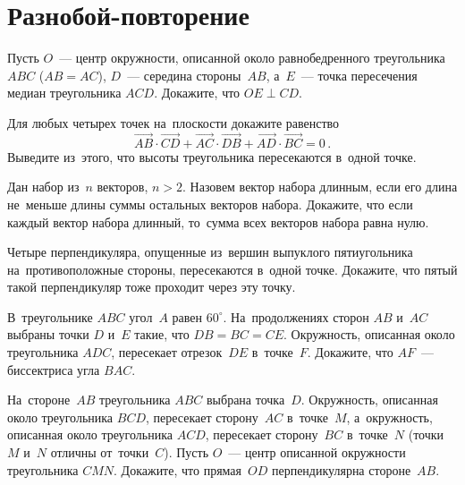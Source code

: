 

\section*{Разнобой-повторение}


\begin{problems}
\let\ov\overrightarrow

\item
Пусть $O$~--- центр окружности, описанной около равнобедренного треугольника
$ABC$ ($AB = AC$), $D$~--- середина стороны~$AB$, а~$E$~--- точка пересечения
медиан треугольника $ACD$.
Докажите, что $OE \perp CD$.

\item
\sp
Для любых четырех точек на~плоскости докажите равенство
\[
    \ov{AB} \cdot \ov{CD} +
    \ov{AC} \cdot \ov{DB} +
    \ov{AD} \cdot \ov{BC}
=
    0
\, . \]
\sp
Выведите из~этого, что высоты треугольника пересекаются в~одной точке.

\item
Дан набор из~$n$ векторов, $n > 2$.
Назовем вектор набора длинным, если его длина не~меньше длины суммы остальных
векторов набора.
Докажите, что если каждый вектор набора длинный, то~сумма всех векторов набора
равна нулю.

\item
Четыре перпендикуляра, опущенные из~вершин выпуклого пятиугольника
на~противоположные стороны, пересекаются в~одной точке.
Докажите, что пятый такой перпендикуляр тоже проходит через эту точку.

\item
В~треугольнике $ABC$ угол~$A$ равен $60^\circ$.
На~продолжениях сторон $AB$ и~$AC$ выбраны точки $D$ и~$E$ такие, что
$DB = BC = CE$.
Окружность, описанная около треугольника $ADC$, пересекает отрезок~$DE$
в~точке~$F$.
Докажите, что $AF$~--- биссектриса угла $BAC$.

\item
На~стороне~$AB$ треугольника $ABC$ выбрана точка~$D$.
Окружность, описанная около треугольника $BCD$, пересекает сторону~$AC$
в~точке~$M$, а~окружность, описанная около треугольника $ACD$, пересекает
сторону~$BC$ в~точке~$N$ (точки $M$ и~$N$ отличны от~точки~$C$).
Пусть $O$~--- центр описанной окружности треугольника $CMN$.
Докажите, что прямая~$OD$ перпендикулярна стороне~$AB$.


\end{problems}
